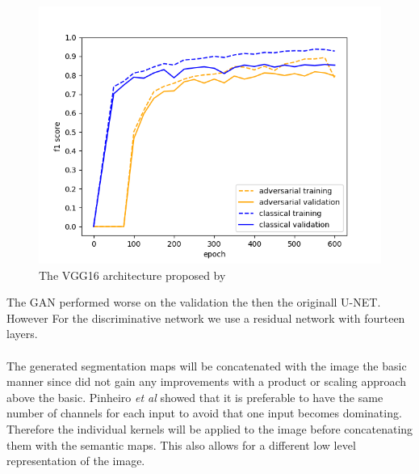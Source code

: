 \documentclass[a4paper,11pt]{article}
\begin{document}
\begin{center}
\begin{figure}[H]
      \includegraphics[scale=0.7]{classical_vs_adversarial}
  \caption{The VGG16 architecture proposed by \cite{simonyan_very_2014}} \label{fig:vgg}
\end{figure}
\end{center}
The GAN performed worse on the validation the then the originall U-NET. However
For the discriminative network we use a residual network with fourteen layers.
\\
\\
The generated segmentation maps will be concatenated with the image the basic manner since \cite{luc_semantic_2016} did not gain any improvements with a product or scaling approach above the basic. Pinheiro \textit{et al} \cite{pinheiro_learning_2016} showed that it is preferable to have the same number of channels for each input to avoid that one input becomes dominating. Therefore the individual kernels will be applied to the image before concatenating them with the semantic maps. This also allows for a different low level representation of the image.



\end{document}
